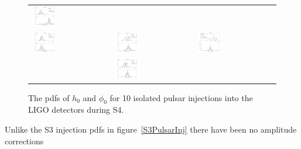 \begin{figure}[!htbp]
\begin{tabular}{l l l}
\includegraphics[width=0.33\textwidth]{figs/S4PULSAR5} \\
\includegraphics[width=0.33\textwidth]{figs/S4PULSAR6} &
\includegraphics[width=0.33\textwidth]{figs/S4PULSAR7} &
\includegraphics[width=0.33\textwidth]{figs/S4PULSAR8} \\
 & \includegraphics[width=0.33\textwidth]{figs/S4PULSAR9} & \\
\end{tabular}
\caption{The pdfs of $h_0$ and $\phi_0$ for 10 isolated pulsar injections into the LIGO detectors
during S4.}\label{S4PulsarInj}
\end{figure}
Unlike the S3 injection pdfs in figure~\ref{S3PulsarInj} there have been no amplitude corrections
